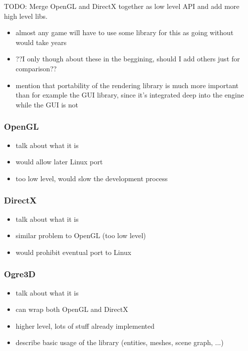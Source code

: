 TODO: Merge OpenGL and DirectX together as low level API and add more high level libs.
\begin{itemize}
    \item almost any game will have to use some library for this as
        going without would take years
    \item ??I only though about these in the beggining, should I add
        others just for comparison??
    \item mention that portability of the rendering library is much more
        important than for example the GUI library, since it's integrated
        deep into the engine while the GUI is not
\end{itemize}

\subsubsection{OpenGL}

\begin{itemize}
    \item talk about what it is
    \item would allow later Linux port
    \item too low level, would slow the development process
\end{itemize}

\subsubsection{DirectX}

\begin{itemize}
    \item talk about what it is
    \item similar problem to OpenGL (too low level)
    \item would prohibit eventual port to Linux
\end{itemize}

\subsubsection{Ogre3D}

\begin{itemize}
    \item talk about what it is
    \item can wrap both OpenGL and DirectX
    \item higher level, lots of stuff already implemented
    \item describe basic usage of the library (entities, meshes, scene graph, ...) 
\end{itemize}

